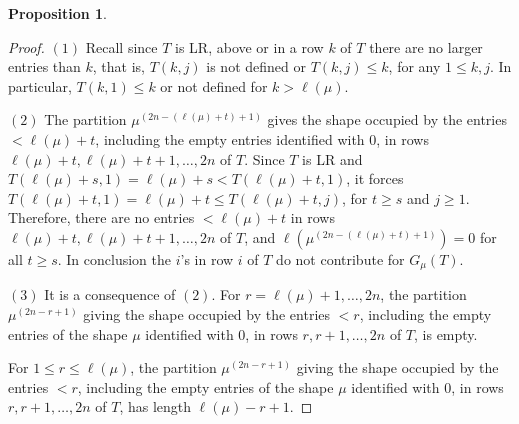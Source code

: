 \documentclass[reqno]{amsart}
\theoremstyle{tplain}
\newtheorem{prop}{Proposition}
\begin{document}
{\begin{prop}
\begin{enumerate}

\end{enumerate}
\end{prop}
\begin{proof}$(1)$
Recall since $T$ is LR,  above or in a row $k$ of  $T$ there are no larger entries  than $k$, that is,  $T(k,j)$ is not defined or  $T(k,j)\le k$, for any $1\le k,j$. In particular, $T(k,1)\le k$ or not defined for $k>\ell(\mu)$.


$(2)$ The partition $\mu^{(2n-(\ell(\mu)+t)+1)}$ gives the
shape occupied by the entries $<\ell(\mu)+t$, including the empty entries identified with $0$,  in rows $\ell(\mu)+t, \ell(\mu)+t + 1, \dots , 2n$ of $T$. Since $T$ is LR and  $T(\ell(\mu)+s,1)=\ell(\mu)+s< T(\ell(\mu)+t,1)$, it forces
$T(\ell(\mu)+t,1)=\ell(\mu)+t\le T(\ell(\mu)+t,j) $, for $t\ge s$ and $j\ge 1$. Therefore, there are no entries $<\ell(\mu)+t$ in rows $\ell(\mu)+t, \ell(\mu)+t + 1, \dots , 2n$ of $T$, and $\ell(\mu^{(2n-(\ell(\mu)+t)+1)})=0$  for all $t\ge s$. In conclusion the $i$'s in row $i$ of $T$ do not contribute for $G_\mu(T)$.

$(3)$ It is a consequence of $(2)$. For $r= \ell(\mu)+1,\dots, 2n$,
the  partition $\mu^{(2n-r+1)}$ giving the
shape occupied by the entries $<r$, including the empty entries of the shape $\mu$  identified with $0$,  in rows $r, r + 1, \dots , 2n$ of $T$, is empty.

For $1\le r\le \ell(\mu)$, the  partition $\mu^{(2n-r+1)}$ giving the
shape occupied by the entries $<r$, including the empty entries of the shape $\mu$  identified with $0$,  in rows $r, r + 1, \dots , 2n$ of $T$, has length $\ell(\mu)-r+1$.


\end{proof}}
\end{document}
